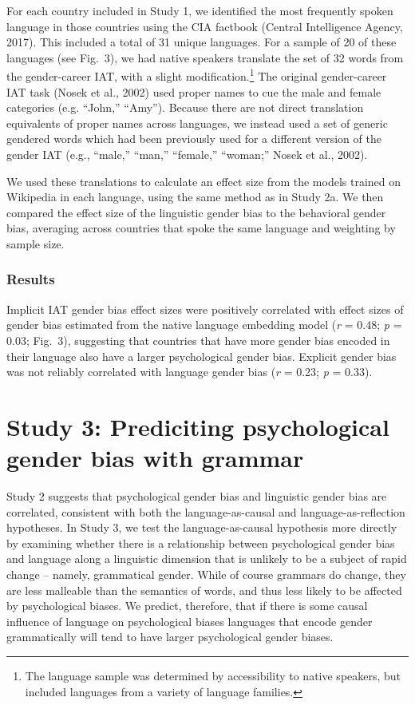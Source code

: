 \documentclass[10pt, letterpaper]{article}
\begin{document}
For each country included in Study 1, we identified the most frequently
spoken language in those countries using the CIA factbook (Central
Intelligence Agency, 2017). This included a total of 31 unique
languages. For a sample of 20 of these languages (see Fig.~3), we had
native speakers translate the set of 32 words from the gender-career
IAT, with a slight
modification.\footnote{The language sample was determined by accessibility to native speakers, but included languages from a variety of language families.}
The original gender-career IAT task (Nosek et al., 2002) used proper
names to cue the male and female categories (e.g. ``John,'' ``Amy'').
Because there are not direct translation equivalents of proper names
across languages, we instead used a set of generic gendered words which
had been previously used for a different version of the gender IAT
(e.g., ``male,'' ``man,'' ``female,'' ``woman;'' Nosek et al., 2002).

We used these translations to calculate an effect size from the models
trained on Wikipedia in each language, using the same method as in Study
2a. We then compared the effect size of the linguistic gender bias to
the behavioral gender bias, averaging across countries that spoke the
same language and weighting by sample size.

\subsubsection{Results}\label{results-2}

Implicit IAT gender bias effect sizes were positively correlated with
effect sizes of gender bias estimated from the native language embedding
model (\emph{r} = 0.48; \emph{p} = 0.03; Fig.~3), suggesting that
countries that have more gender bias encoded in their language also have
a larger psychological gender bias. Explicit gender bias was not
reliably correlated with language gender bias (\emph{r} = 0.23; \emph{p}
= 0.33).

\section{Study 3: Prediciting psychological gender bias with
grammar}\label{study-3-prediciting-psychological-gender-bias-with-grammar}

Study 2 suggests that psychological gender bias and linguistic gender
bias are correlated, consistent with both the language-as-causal and
language-as-reflection hypotheses. In Study 3, we test the
language-as-causal hypothesis more directly by examining whether there
is a relationship between psychological gender bias and language along a
linguistic dimension that is unlikely to be a subject of rapid change --
namely, grammatical gender. While of course grammars do change, they are
less malleable than the semantics of words, and thus less likely to be
affected by psychological biases. We predict, therefore, that if there
is some causal influence of language on psychological biases languages
that encode gender grammatically will tend to have larger psychological
gender biases.
\end{document}
